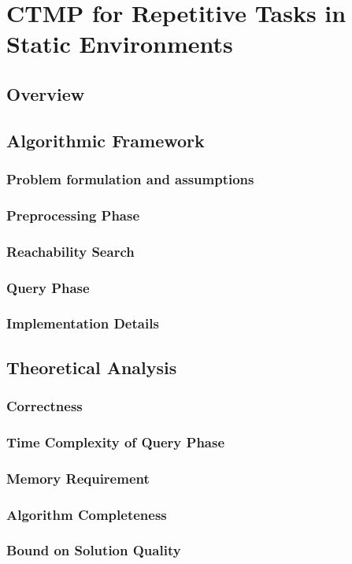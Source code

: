 \documentclass[a4paper,10pt]{article}
\begin{document}
\section{CTMP for Repetitive Tasks in Static Environments}
\subsection{Overview}
\subsection{Algorithmic Framework}
\subsubsection{Problem formulation and assumptions}
\subsubsection{Preprocessing Phase}
\subsubsection{Reachability Search}
\subsubsection{Query Phase}
\subsubsection{Implementation Details}
\subsection{Theoretical Analysis}
\subsubsection{Correctness}
\subsubsection{Time Complexity of Query Phase}
\subsubsection{Memory Requirement}
\subsubsection{Algorithm Completeness}
\subsubsection{Bound on Solution Quality}
\end{document}
